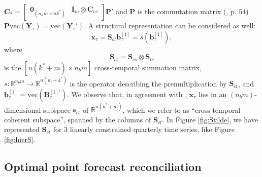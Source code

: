 \documentclass[a4paper,11pt]{article}
\newcommand{\bvet}{\bm{b}}
\newcommand{\xvet}{\bm{x}}
\newcommand{\Bvet}{\bm{B}}
\newcommand{\Cvet}{\bm{C}}
\newcommand{\Ivet}{\bm{I}}
\newcommand{\Pvet}{\bm{P}}
\newcommand{\Svet}{\bm{S}}
\newcommand{\Yvet}{\bm{Y}}
\newcommand{\Zerovet}{\bm{0}}
\theoremstyle{definition}
\begin{document}
$\Cvet_\ast = \begin{bmatrix}\Zerovet_{(n_a m\times nk^\ast)} & \Ivet_m \otimes \Cvet_{cs}\end{bmatrix}\Pvet'$ and $\Pvet$ is the commutation matrix (\citealp{magnus2019}, p. 54) $\Pvet \mathrm{vec}\left(\Yvet_{\tau}\right) = \mathrm{vec}\left(\Yvet_{\tau}'\right)$. A structural representation can be considered as well:
$$
\xvet_\tau = \Svet_{ct}\bvet^{[1]}_\tau = s\left(\bvet_{\tau}^{[1]}\right),
$$
where 
\begin{equation}
	\label{eq:Sct}
	\Svet_{ct} = \Svet_{cs} \otimes \Svet_{te}
\end{equation}
is the $\left[n(k^\ast+m)\times n_b m\right]$ cross-temporal summation matrix, $s: \mathbb{R}^{n_b m} \rightarrow \mathbb{R}^{n(m+k^\ast)}$ is the operator describing the premultiplication by $\Svet_{ct}$, and $\bvet^{[1]}_\tau = \mathrm{vec}\left(\Bvet^{[1]\prime}_{\tau}\right)$. We observe that, in agreement with \cite{panagiotelis2021}, $\xvet_{\tau}$ lies in an $(n_b m)$-dimensional subspace $\mathfrak{s}_{ct}$ of $\mathbb{R}^{n(k^\ast+m)}$, which we refer to as “cross-temporal coherent subspace”, spanned by the columns of $\Svet_{ct}$.
In Figure \ref{fig:Stilde}, we have represented $\Svet_{ct}$ for 3 linearly constrained quarterly time series, like Figure \ref{fig:hierS}.



\subsection{Optimal point forecast reconciliation}\label{ssec:oct}
\end{document}
